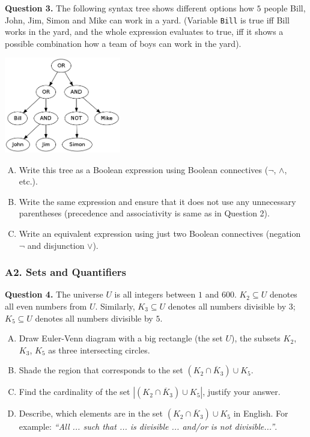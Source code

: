 \documentclass[jou]{apa6}
\begin{document}
\vspace{6pt}
{\bf Question 3.} The following syntax tree shows different options how 
$5$ people \textendash{} Bill, John, Jim, Simon and Mike \textendash{} can 
work in a yard. (Variable {\tt Bill} is true iff Bill works in the yard, 
and the whole expression evaluates to true, iff it shows a possible combination
how a team of boys can work in the yard). 
\begin{center}
\includegraphics[width=2in]{midterm/syntax-tree.png}
\end{center}
\begin{enumerate}[(A)]
\item Write this tree as a Boolean expression using 
Boolean connectives ($\neg$, $\wedge$, etc.).
\item Write the same expression and ensure that it does not 
use any unnecessary parentheses (precedence and associativity is 
same as in Question 2). 
\item Write an equivalent expression using just two Boolean 
connectives (negation $\neg$ and disjunction $\vee$). 
\end{enumerate}


\subsubsection{A2. Sets and Quantifiers}

{\bf Question 4.} 
The universe $U$ is all integers between $1$ and $600$. 
$K_2 \subseteq U$ denotes all even numbers from $U$.
Similarly, $K_3 \subseteq U$ denotes all numbers divisible by $3$; 
$K_5 \subseteq U$ denotes all numbers divisible by $5$. 

\begin{enumerate}[(A)]
\item Draw Euler-Venn diagram with a big rectangle (the set $U$), 
the subsets $K_2$, $K_3$, $K_5$ as three intersecting circles.
\item Shade the region that corresponds to the set
$(K_2 \cap \overline K_3) \cup K_5$. 
\item Find the cardinality of the set
$\left| (K_2 \cap \overline K_3) \cup K_5 \right|$, 
justify your answer. 
\item Describe, which elements are in the set 
$(K_2 \cap \overline K_3) \cup K_5$ in English. 
For example: {\em ``All ... such that ... is divisible ... 
and/or is not divisible...''}. 
\end{enumerate}
\end{document}
